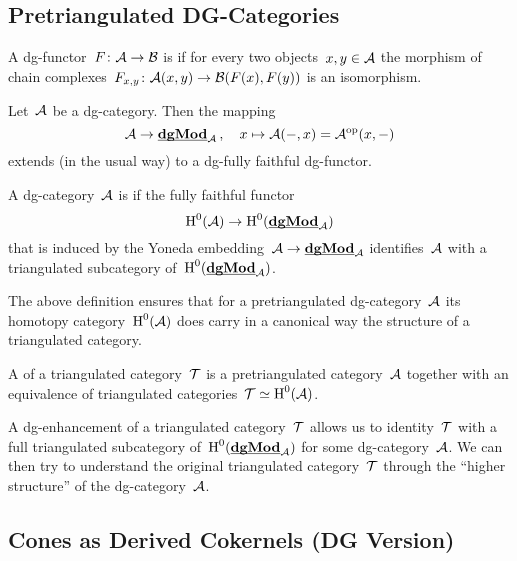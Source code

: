 \documentclass[a4paper,10pt]{scrartcl}
\begin{document}
\subsection{Pretriangulated DG-Categories}

\begin{definition}
  A dg-functor~$F \colon \mathcal{A} \to \mathcal{B}$ is  if for every two objects~$x, y \in \mathcal{A}$ the morphism of chain complexes~$F_{x,y} \colon \mathcal{A}(x,y) \to \mathcal{B}(F(x), F(y))$ is an isomorphism.
\end{definition}

\begin{proposition}
  Let~$\mathcal{A}$ be a dg-category.
  Then the mapping
  \[
    \mathcal{A}
    \to
    \underline{\smash{\mathbf{dgMod}}}_{\mathcal{A}} \,,
    \quad
    x
    \mapsto
    \mathcal{A}(-,x)
    =
    \mathcal{A}^{{\mathrm{op}}}(x,-)
  \]
  extends (in the usual way) to a dg-fully faithful dg-functor.
\end{proposition}

\begin{definition}
  A dg-category~$\mathcal{A}$ is  if the fully faithful {\klinear} functor
  \[
    \operatorname{H}^0(\mathcal{A})
    \to
    \operatorname{H}^0(\underline{\smash{\mathbf{dgMod}}}_{\mathcal{A}})
  \]
  that is induced by the Yoneda embedding~$\mathcal{A} \to \underline{\smash{\mathbf{dgMod}}}_{\mathcal{A}}$ identifies~$\mathcal{A}$ with a triangulated subcategory of~$\operatorname{H}^0(\underline{\smash{\mathbf{dgMod}}}_{\mathcal{A}})$.
\end{definition}

The above definition ensures that for a pretriangulated dg-category~$\mathcal{A}$ its homotopy category~$\operatorname{H}^0(\mathcal{A})$ does carry in a canonical way the structure of a triangulated category.

\begin{definition}
  A  of a triangulated category~$\mathcal{T}$ is a pretriangulated category~$\mathcal{A}$ together with an equivalence of triangulated categories~$\mathcal{T} \simeq \operatorname{H}^0(\mathcal{A})$.
\end{definition}


A dg-enhancement of a triangulated category~$\mathcal{T}$ allows us to identity~$\mathcal{T}$ with a full triangulated subcategory of~$\operatorname{H}^0(\underline{\smash{\mathbf{dgMod}}}_{\mathcal{A}})$ for some dg-category~$\mathcal{A}$.
We can then try to understand the original triangulated category~$\mathcal{T}$ through the \enquote{higher structure} of the dg-category~$\mathcal{A}$.



\subsection{Cones as Derived Cokernels (DG Version)}
\end{document}
